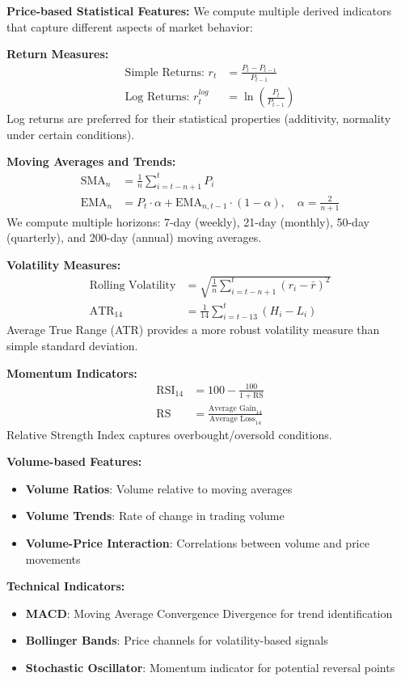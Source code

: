 \documentclass[conference]{IEEEtran}
\begin{document}
\textbf{Price-based Statistical Features:}
We compute multiple derived indicators that capture different aspects of market behavior:

\textbf{Return Measures:}
\begin{align}
\text{Simple Returns: } r_t &= \frac{P_t - P_{t-1}}{P_{t-1}} \\
\text{Log Returns: } r_t^{log} &= \ln\left(\frac{P_t}{P_{t-1}}\right)
\end{align}
Log returns are preferred for their statistical properties (additivity, normality under certain conditions).

\textbf{Moving Averages and Trends:}
\begin{align}
\text{SMA}_n &= \frac{1}{n} \sum_{i=t-n+1}^{t} P_i \\
\text{EMA}_n &= P_t \cdot \alpha + \text{EMA}_{n,t-1} \cdot (1 - \alpha), \quad \alpha = \frac{2}{n+1}
\end{align}
We compute multiple horizons: 7-day (weekly), 21-day (monthly), 50-day (quarterly), and 200-day (annual) moving averages.

\textbf{Volatility Measures:}
\begin{align}
\text{Rolling Volatility} &= \sqrt{\frac{1}{n} \sum_{i=t-n+1}^{t} (r_i - \bar{r})^2} \\
\text{ATR}_{14} &= \frac{1}{14} \sum_{i=t-13}^{t} (H_i - L_i)
\end{align}
Average True Range (ATR) provides a more robust volatility measure than simple standard deviation.

\textbf{Momentum Indicators:}
\begin{align}
\text{RSI}_{14} &= 100 - \frac{100}{1 + \text{RS}} \\
\text{RS} &= \frac{\text{Average Gain}_{14}}{\text{Average Loss}_{14}}
\end{align}
Relative Strength Index captures overbought/oversold conditions.

\textbf{Volume-based Features:}
\begin{itemize}
  \item \textbf{Volume Ratios}: Volume relative to moving averages
  \item \textbf{Volume Trends}: Rate of change in trading volume
  \item \textbf{Volume-Price Interaction}: Correlations between volume and price movements
\end{itemize}

\textbf{Technical Indicators:}
\begin{itemize}
  \item \textbf{MACD}: Moving Average Convergence Divergence for trend identification
  \item \textbf{Bollinger Bands}: Price channels for volatility-based signals
  \item \textbf{Stochastic Oscillator}: Momentum indicator for potential reversal points
\end{itemize}
\end{document}
